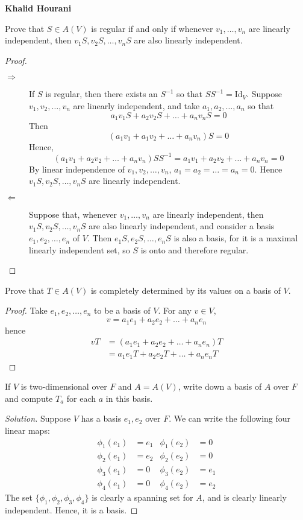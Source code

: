 \documentclass[12pt,leqno]{article}
\numberwithin{equation}{section}
\newcommand{\question}[2] {\vspace{.25in} \noindent\fbox{#1} #2 \vspace{.10in}}
\theoremstyle{definition}
\begin{document}
\thispagestyle{plain}
\begin{flushright}
\large{\textbf{Khalid Hourani\\
}}
\end{flushright}

\question{1}{Prove that $S\in A(V)$ is regular if and only if whenever $v_1,\hdots,v_n$ are linearly independent, then $v_1S,v_2S,\hdots,v_nS$ are also linearly independent.}

\begin{proof}
 \begin{description}
  \item [$\Rightarrow$] If $S$ is regular, then there exists an $S^{-1}$ so that $SS^{-1}=\text{Id}_V$. Suppose $v_1,v_2,\hdots,v_n$ are linearly independent, and take $a_1,a_2,\hdots,a_n$ so that \[a_1v_1S+a_2v_2S+\hdots+a_nv_nS=0\] Then \[(a_1v_1+a_1v_2+\hdots+a_nv_n)S=0\] Hence, \[(a_1v_1+a_2v_2+\hdots+a_nv_n)SS^{-1}=a_1v_1+a_2v_2+\hdots+a_nv_n=0\] By linear independence of $v_1,v_2,\hdots,v_n$, $a_1=a_2=\hdots=a_n=0$. Hence $v_1S,v_2S,\hdots,v_nS$  are linearly independent.
  \item [$\Leftarrow$] Suppose that, whenever $v_1,\hdots,v_n$ are linearly independent, then $v_1S,v_2S,\hdots,v_nS$ are also linearly independent, and consider a basis $e_1,e_2,\hdots,e_n$ of $V$. Then $e_1S,e_2S,\hdots,e_nS$ is also a basis, for it is a maximal linearly independent set, so $S$ is onto and therefore regular.
 \end{description}
\end{proof}

\question{2}{Prove that $T\in A(V)$ is completely determined by its values on a basis of $V$.}

\begin{proof}
Take $e_1,e_2,\hdots,e_n$ to be a basis of $V$. For any $v\in V$, \[v=a_1e_1+a_2e_2+\hdots+a_ne_n\] hence \begin{align*}vT&=(a_1e_1+a_2e_2+\hdots+a_ne_n)T\\&=a_1e_1T+a_2e_2T+\hdots+a_ne_nT\end{align*}
\end{proof}

\question{5}{If $V$ is two-dimensional over $F$ and $A=A(V)$, write down a basis of $A$ over $F$ and compute $T_a$ for each $a$ in this basis.}

\begin{proof}[Solution]
 Suppose $V$ has a basis $e_1,e_2$ over $F$. We can write the following four linear maps:\begin{align*}\phi_1(e_1)&=e_1&\phi_1(e_2)&=0\\\phi_2(e_1)&=e_2&\phi_2(e_2)&=0\\\phi_3(e_1)&=0&\phi_3(e_2)&=e_1\\\phi_4(e_1)&=0&\phi_4(e_2)&=e_2\end{align*} The set $\{\phi_1,\phi_2,\phi_3,\phi_4\}$ is clearly a spanning set for $A$, and is clearly linearly independent. Hence, it is a basis.
\end{proof}
\end{document}

